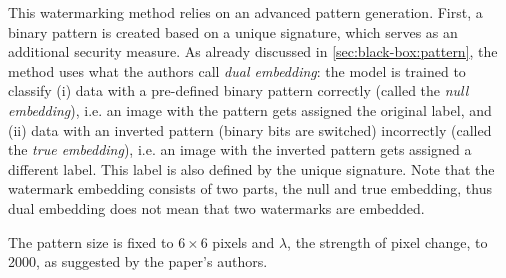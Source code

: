 This watermarking method relies on an advanced pattern generation. First, a binary pattern is created based on a unique signature, which serves as an additional security measure. As already discussed in \cref{sec:black-box:pattern}, the method uses what the authors call \textit{dual embedding}: the model is trained to classify (i) data with a pre-defined binary pattern correctly (called the \textit{null embedding}), i.e. an image with the pattern gets assigned the original label, and (ii) data with an inverted pattern (binary bits are switched) incorrectly (called the \textit{true embedding}), i.e. an image with the inverted pattern gets assigned a different label.
This label is also defined by the unique signature. Note that the watermark embedding consists of two parts, the null and true embedding, thus dual embedding does not mean that two watermarks are embedded.

The pattern size is fixed to $6\times6$ pixels and $\lambda$, the strength of pixel change, to 2000, as suggested by the paper's authors.




